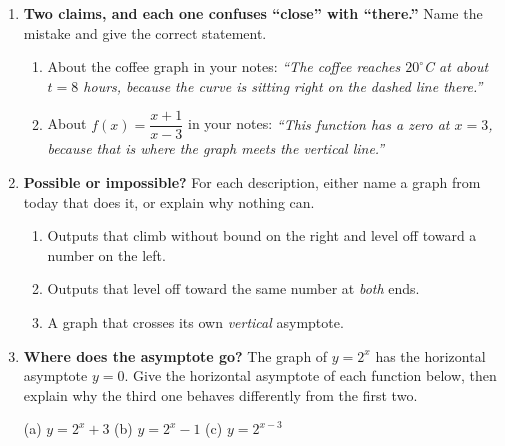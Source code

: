 \documentclass[10pt]{article}
\begin{document}
\boxguard[30]
\begin{tcolorbox}[colback=white, colframe=black!40, title=\textbf{Tier E --- Extension},
    fonttitle=\bfseries, arc=2mm, left=3mm, right=3mm, top=2mm, bottom=2mm, breakable]
\small

\begin{enumerate}[leftmargin=1.6em, itemsep=4pt, topsep=2pt]
  \item \textbf{Two claims, and each one confuses ``close'' with ``there.''} Name the mistake and give
        the correct statement.
        \begin{enumerate}[label=(\alph*), leftmargin=1.6em, itemsep=3pt, topsep=3pt]
          \item About the coffee graph in your notes: \emph{``The coffee reaches $20^\circ$C at about
                $t=8$ hours, because the curve is sitting right on the dashed line there.''}


          \item About $f(x)=\dfrac{x+1}{x-3}$ in your notes: \emph{``This function has a zero at
                $x=3$, because that is where the graph meets the vertical line.''}

        \end{enumerate}

  \item \textbf{Possible or impossible?} For each description, either name a graph from today that
        does it, or explain why nothing can.
        \begin{enumerate}[label=(\alph*), leftmargin=1.6em, itemsep=3pt, topsep=3pt]
          \item Outputs that climb without bound on the right and level off toward a number on the
                left.


          \item Outputs that level off toward the same number at \emph{both} ends.


          \item A graph that crosses its own \emph{vertical} asymptote.

        \end{enumerate}

  \item \textbf{Where does the asymptote go?} The graph of $y=2^x$ has the horizontal asymptote
        $y=0$. Give the horizontal asymptote of each function below, then explain why the third one
        behaves differently from the first two.
\smallskip

\hspace{1.2em} (a) $y=2^x+3$ \qquad (b) $y=2^x-1$ \qquad (c) $y=2^{x-3}$

\end{enumerate}
\end{tcolorbox}
\end{document}
